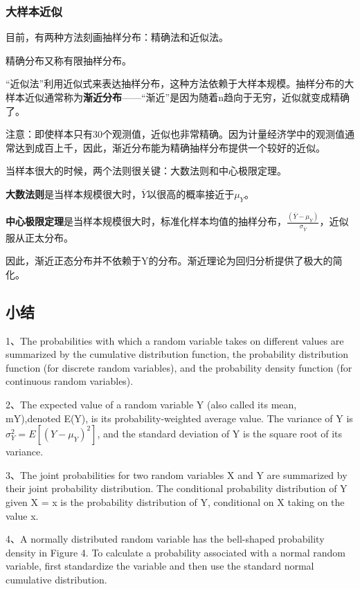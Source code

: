 \documentclass[cn,12pt,math=newtx,citestyle=gb7714-2015,bibstyle=gb7714-2015]{elegantbook}
\begin{document}
	\subsubsection{大样本近似}
	目前，有两种方法刻画抽样分布：精确法和近似法。
	
	精确分布又称有限抽样分布。
	
	“近似法”利用近似式来表达抽样分布，这种方法依赖于大样本规模。抽样分布的大样本近似通常称为\textbf{渐近分布}——“渐近”是因为随着n趋向于无穷，近似就变成精确了。
	
	注意：即使样本只有30个观测值，近似也非常精确。因为计量经济学中的观测值通常达到成百上千，因此，渐近分布能为精确抽样分布提供一个较好的近似。
	
	当样本很大的时候，两个法则很关键：大数法则和中心极限定理。
	
	\textbf{大数法则}是当样本规模很大时，$\overline{Y}$以很高的概率接近于$\mu_Y$。
	
	\textbf{中心极限定理}是当样本规模很大时，标准化样本均值的抽样分布，$\frac{(\overline{Y}-\mu_Y)}{\sigma_{\overline{Y}}}$，近似服从正太分布。
	
	因此，渐近正态分布并不依赖于Y的分布。渐近理论为回归分析提供了极大的简化。
	
	\subsection{小结}
	1、The probabilities with which a random variable takes on different values are summarized by the cumulative distribution function, the probability distribution function (for discrete random variables), and the probability density function (for continuous random variables).
	
	2、The expected value of a random variable Y (also called its mean, mY),denoted E(Y), is its probability-weighted average value. The variance of Y
	is $\sigma_Y^2=E[(Y-\mu_Y)^2]$, and the standard deviation of Y is the square root of its variance.
	
	3、The joint probabilities for two random variables X and Y are summarized by their joint probability distribution. The conditional probability distribution of Y given X = x is the probability distribution of Y, conditional on X taking on the value x.
	
	4、A normally distributed random variable has the bell-shaped probability density in Figure 4. To calculate a probability associated with a normal random variable, first standardize the variable and then use the standard normal cumulative distribution.
	
\end{document}
